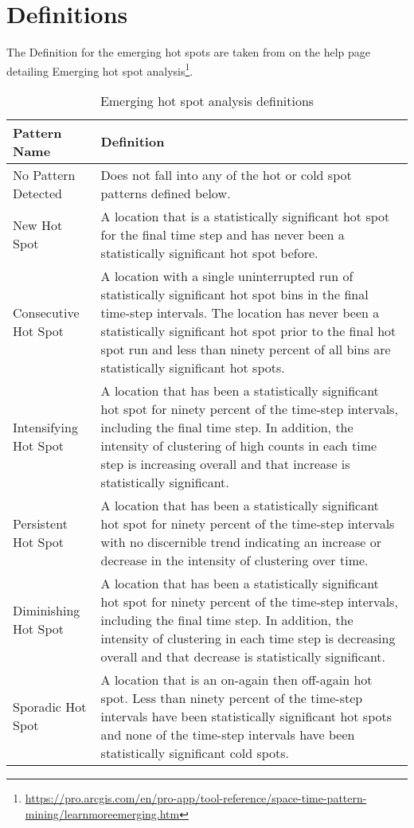 \chapter{Definitions}
\label{Definition_appendix}

The Definition for the emerging hot spots are taken from \cite{Esri} on the help page detailing Emerging hot spot analysis\footnote{\url{https://pro.arcgis.com/en/pro-app/tool-reference/space-time-pattern-mining/learnmoreemerging.htm}}. 

\begin{longtable}{|l|p{10cm}|}
\caption[Emerging Hot Spot Analysis Definitions]{Emerging Hot Spot Analysis Definitions} 
\label{App:EmergingHotspotdef}
\endfirsthead
\caption{Emerging hot spot analysis definitions} 
\endhead
\hline
Pattern Name & Definition \\ \hline
No Pattern Detected & Does not fall into any of the hot or cold spot patterns defined below. \\ \hline
New Hot Spot & A location that is a statistically significant hot spot for the final time step and has never been a statistically significant hot spot before. \\ \hline
Consecutive Hot Spot & A location with a single uninterrupted run of statistically significant hot spot bins in the final time-step intervals. The location has never been a statistically significant hot spot prior to the final hot spot run and less than ninety percent of all bins are statistically significant hot spots. \\ \hline
Intensifying Hot Spot & A location that has been a statistically significant hot spot for ninety percent of the time-step intervals, including the final time step. In addition, the intensity of clustering of high counts in each time step is increasing overall and that increase is statistically significant. \\ \hline
Persistent Hot Spot & A location that has been a statistically significant hot spot for ninety percent of the time-step intervals with no discernible trend indicating an increase or decrease in the intensity of clustering over time. \\ \hline
Diminishing Hot Spot & A location that has been a statistically significant hot spot for ninety percent of the time-step intervals, including the final time step. In addition, the intensity of clustering in each time step is decreasing overall and that decrease is statistically significant. \\ \hline
Sporadic Hot Spot & A location that is an on-again then off-again hot spot. Less than ninety percent of the time-step intervals have been statistically significant hot spots and none of the time-step intervals have been statistically significant cold spots. \\ \hline

\end{longtable}
